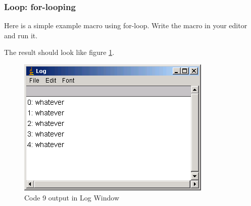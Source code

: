 \subsubsection{Loop: for-looping}
Here is a simple example macro using for-loop. Write the macro in your editor and run it. 

%
The result should look like figure \ref{fig_whateverOut}.

\begin{figure}[h!]
\begin{center}
\includegraphics[scale=0.6]{fig/fig2311_whatever5.png}
\caption{Code 9 output in Log Window}
\label{fig_whateverOut}
\end{center}
\end{figure}


